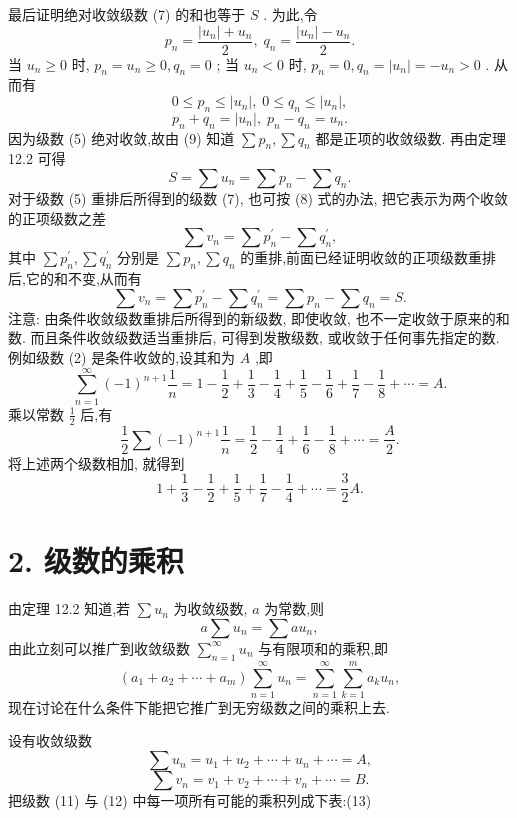 最后证明绝对收敛级数 (7) 的和也等于 \(S\) . 为此,令
\[
{p}_{n} = \frac{\left| {u}_{n}\right|  + {u}_{n}}{2},\;{q}_{n} = \frac{\left| {u}_{n}\right|  - {u}_{n}}{2}. \tag{8}
\]
当 \({u}_{n} \geq  0\) 时, \({p}_{n} = {u}_{n} \geq  0,{q}_{n} = 0\) ; 当 \({u}_{n} < 0\) 时, \({p}_{n} = 0,{q}_{n} = \left| {u}_{n}\right|  =  - {u}_{n} > 0\) . 从而有
\[
0 \leq  {p}_{n} \leq  \left| {u}_{n}\right| ,\;0 \leq  {q}_{n} \leq  \left| {u}_{n}\right| , \tag{9}
\]
\[
{p}_{n} + {q}_{n} = \left| {u}_{n}\right| ,\;{p}_{n} - {q}_{n} = {u}_{n}. \tag{10}
\]
因为级数 (5) 绝对收敛,故由 (9) 知道 \(\sum {p}_{n},\sum {q}_{n}\) 都是正项的收敛级数. 再由定理 12.2 可得
\[
S = \sum {u}_{n} = \sum {p}_{n} - \sum {q}_{n}.
\]
对于级数 (5) 重排后所得到的级数 (7), 也可按 (8) 式的办法, 把它表示为两个收敛的正项级数之差
\[
\sum {v}_{n} = \sum {p}_{n}^{\prime } - \sum {q}_{n}^{\prime },
\]
其中 \(\sum {p}_{n}^{\prime },\sum {q}_{n}^{\prime }\) 分别是 \(\sum {p}_{n},\sum {q}_{n}\) 的重排,前面已经证明收敛的正项级数重排后,它的和不变,从而有
\[
\sum {v}_{n} = \sum {p}_{n}^{\prime } - \sum {q}_{n}^{\prime } = \sum {p}_{n} - \sum {q}_{n} = S.
\]
注意: 由条件收敛级数重排后所得到的新级数, 即使收敛, 也不一定收敛于原来的和数. 而且条件收敛级数适当重排后, 可得到发散级数, 或收敛于任何事先指定的数. 例如级数 (2) 是条件收敛的,设其和为 \(A\) ,即
\[
\mathop{\sum }\limits_{{n = 1}}^{\infty }{\left( -1\right) }^{n + 1}\frac{1}{n} = 1 - \frac{1}{2} + \frac{1}{3} - \frac{1}{4} + \frac{1}{5} - \frac{1}{6} + \frac{1}{7} - \frac{1}{8} + \cdots  = A.
\]
乘以常数 \(\frac{1}{2}\) 后,有
\[
\frac{1}{2}\sum {\left( -1\right) }^{n + 1}\frac{1}{n} = \frac{1}{2} - \frac{1}{4} + \frac{1}{6} - \frac{1}{8} + \cdots  = \frac{A}{2}.
\]
将上述两个级数相加, 就得到
\[
1 + \frac{1}{3} - \frac{1}{2} + \frac{1}{5} + \frac{1}{7} - \frac{1}{4} + \cdots  = \frac{3}{2}A.
\]
\section{2. 级数的乘积}

由定理 12.2 知道,若 \(\sum {u}_{n}\) 为收敛级数, \(a\) 为常数,则
\[
a\sum {u}_{n} = \sum a{u}_{n},
\]
由此立刻可以推广到收敛级数 \(\mathop{\sum }\limits_{{n = 1}}^{\infty }{u}_{n}\) 与有限项和的乘积,即
\[
\left( {{a}_{1} + {a}_{2} + \cdots  + {a}_{m}}\right) \mathop{\sum }\limits_{{n = 1}}^{\infty }{u}_{n} = \mathop{\sum }\limits_{{n = 1}}^{\infty }\mathop{\sum }\limits_{{k = 1}}^{m}{a}_{k}{u}_{n},
\]
现在讨论在什么条件下能把它推广到无穷级数之间的乘积上去.

设有收敛级数
\[
\sum {u}_{n} = {u}_{1} + {u}_{2} + \cdots  + {u}_{n} + \cdots  = A, \tag{11}
\]
\[
\sum {v}_{n} = {v}_{1} + {v}_{2} + \cdots  + {v}_{n} + \cdots  = B. \tag{12}
\]
把级数 (11) 与 (12) 中每一项所有可能的乘积列成下表:(13)

